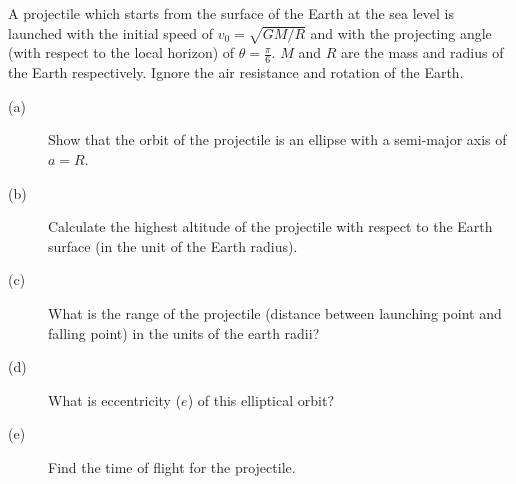 A projectile which starts from the surface of the Earth at the sea level is
launched with the initial speed of $v_0 = \sqrt{GM/R}$ and with the projecting
angle (with respect to the local horizon) of $\theta = \frac{\pi}{6}$. $M$ and
$R$ are the mass and radius of the Earth respectively. Ignore the air
resistance and rotation of the Earth.

\begin{description}
\item[(a)] Show that the orbit of the projectile is an ellipse with a
  semi-major axis of $a = R$.
\item[(b)] Calculate the highest altitude of the projectile with respect to the
  Earth surface (in the unit of the Earth radius).
\item[(c)] What is the range of the projectile (distance between launching
  point and falling point) in the units of the earth radii?
\item[(d)] What is eccentricity ($e$) of this elliptical orbit?
\item[(e)] Find the time of flight for the projectile.
\end{description}

